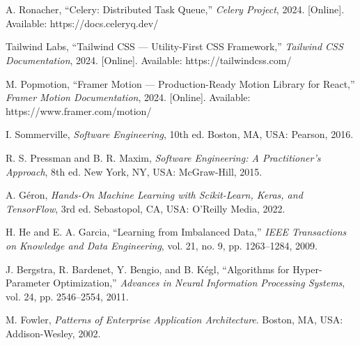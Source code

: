 \documentclass[12pt,a4paper]{report}
\makeatletter
\renewenvironment{thebibliography}[1]
  {\section*{}\@mkboth{}{}%
   \list{\@biblabel{\@arabic\c@enumiv}}%
        {\settowidth\labelwidth{\@biblabel{#1}}%
         \leftmargin\labelwidth
         \advance\leftmargin\labelsep
         \itemsep=0.6\baselineskip
         \usecounter{enumiv}%
         \let\p@enumiv\@empty
         \renewcommand\theenumiv{\@arabic\c@enumiv}}%
   \sloppy}
  {\endlist}
\makeatother
\begin{document}
\begin{thebibliography}{20}
A. Ronacher, ``Celery: Distributed Task Queue,''
\textit{Celery Project}, 2024. [Online]. Available: https://docs.celeryq.dev/

Tailwind Labs, ``Tailwind CSS — Utility-First CSS Framework,''
\textit{Tailwind CSS Documentation}, 2024. [Online]. Available: https://tailwindcss.com/

M. Popmotion, ``Framer Motion — Production-Ready Motion Library for React,''
\textit{Framer Motion Documentation}, 2024. [Online]. Available: https://www.framer.com/motion/

I. Sommerville, \textit{Software Engineering}, 10th ed.
Boston, MA, USA: Pearson, 2016.

R. S. Pressman and B. R. Maxim, \textit{Software Engineering: A Practitioner's Approach}, 8th ed.
New York, NY, USA: McGraw-Hill, 2015.

A. G\'eron, \textit{Hands-On Machine Learning with Scikit-Learn, Keras, and TensorFlow}, 3rd ed.
Sebastopol, CA, USA: O'Reilly Media, 2022.

H. He and E. A. Garcia, ``Learning from Imbalanced Data,''
\textit{IEEE Transactions on Knowledge and Data Engineering}, vol. 21, no. 9, pp. 1263--1284, 2009.

J. Bergstra, R. Bardenet, Y. Bengio, and B. K\'egl, ``Algorithms for Hyper-Parameter Optimization,''
\textit{Advances in Neural Information Processing Systems}, vol. 24, pp. 2546--2554, 2011.

M. Fowler, \textit{Patterns of Enterprise Application Architecture}.
Boston, MA, USA: Addison-Wesley, 2002.


\end{thebibliography}
\end{document}
